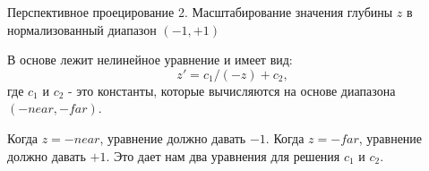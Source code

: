 \documentclass{beamer}
\begin{document}
	\begin{frame}{Перспективное проецирование}
		2. Масштабирование значения глубины $z$ в нормализованный диапазон $(-1, +1)$
		
В основе лежит нелинейное уравнение и имеет вид: 
\[
	z' = c_1/(-z) + c_2, 
\]
где $c_1$ и $c_2$ - это константы, которые вычисляются на основе диапазона $(-near, -far)$. 

Когда $z = -near$, уравнение должно давать $-1$. 
Когда $z = -far$, уравнение должно давать $+1$. 
Это дает нам два уравнения для решения $c_1$ и $c_2$.

\end{frame}
\end{document}
